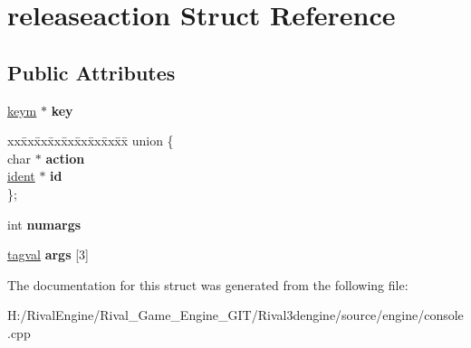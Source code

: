 \hypertarget{structreleaseaction}{}\section{releaseaction Struct Reference}
\label{structreleaseaction}
\subsection*{Public Attributes}
\begin{DoxyCompactItemize}
\item 
\mbox{\label{structreleaseaction_a399f43179151b79bbf3701b47695f2ce}} 
\hyperlink{structkeym}{keym} $\ast$ {\bfseries key}
\item 
\mbox{\label{structreleaseaction_a9539cc139a722a21b8844f04b1e8edf3}} 
\begin{tabbing}
xx\=xx\=xx\=xx\=xx\=xx\=xx\=xx\=xx\=\kill
union \{\\
\>char $\ast$ {\bfseries action}\\
\>\hyperlink{structident}{ident} $\ast$ {\bfseries id}\\
\}; \\

\end{tabbing}\item 
\mbox{\label{structreleaseaction_a9227fda16517c840fad0bb44929768c1}} 
int {\bfseries numargs}
\item 
\mbox{\label{structreleaseaction_a716c967522e9c540a39d5ae62b408bac}} 
\hyperlink{structtagval}{tagval} {\bfseries args} \mbox{[}3\mbox{]}
\end{DoxyCompactItemize}


The documentation for this struct was generated from the following file\+:\begin{DoxyCompactItemize}
\item 
H\+:/\+Rival\+Engine/\+Rival\+\_\+\+Game\+\_\+\+Engine\+\_\+\+G\+I\+T/\+Rival3dengine/source/engine/console.\+cpp\end{DoxyCompactItemize}
